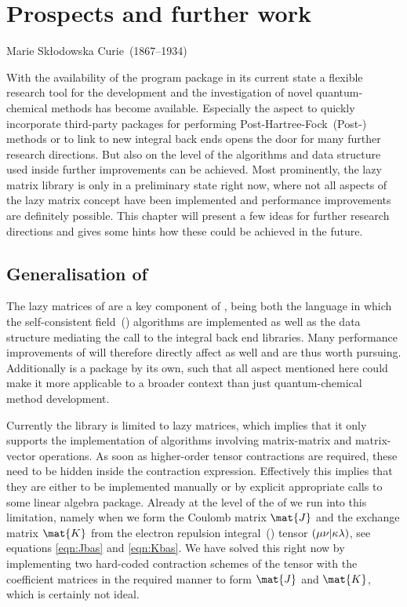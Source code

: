 \chapter{Prospects and further work}
\label{ch:Prospects}
{Marie Skłodowska Curie~(1867--1934)}

\noindent
With the availability of the \molsturm program package in its
current state a flexible research tool
for the development and the investigation of novel quantum-chemical methods
has become available.
Especially the aspect to quickly incorporate third-party packages
for performing Post-Hartree-Fock~(Post-\HF) methods
or to link to new integral back ends
opens the door for many further research directions.
But also on the level of the algorithms and data structure used
inside \molsturm further improvements can be achieved.
Most prominently, the \lazyten lazy matrix library is only
in a preliminary state right now,
where not all aspects of the lazy matrix concept have been implemented
and performance improvements are definitely possible.
This chapter will present a few ideas for further research directions
and gives some hints how these could be achieved in the future.

\section{Generalisation of \lazyten}
\label{sec:GeneraliseLazyten}
The lazy matrices of \lazyten are a key component of \molsturm,
being both the language in which the self-consistent field~(\SCF)
algorithms are implemented
as well as the data structure
mediating the call to the integral back end libraries.
Many performance improvements of \lazyten will therefore
directly affect \molsturm as well and are thus worth pursuing.
Additionally \lazyten is a package by its own,
such that all aspect mentioned here could make it more
applicable to a broader context than just
quantum-chemical method development.

Currently the \lazyten library is limited to lazy matrices,
which implies that it only supports the implementation of algorithms
involving matrix-matrix and matrix-vector operations.
As soon as higher-order tensor contractions are required,
these need to be hidden inside the contraction expression.
Effectively this implies
that they are either to be implemented manually
or by explicit appropriate calls to some linear algebra package.
Already at the level of the \SCF of \molsturm we run into this limitation,
namely when we form the Coulomb matrix $\mat{J}$
and the exchange matrix $\mat{K}$ from the electron repulsion integral~(\ERI) tensor
$\left( \mu\nu \middle| \kappa\lambda \right)$, see equations \eqref{eqn:Jbas} and \eqref{eqn:Kbas}.
We have solved this right now by implementing two
hard-coded contraction schemes of the \ERI tensor with
the coefficient matrices in the required manner to form $\mat{J}$ and $\mat{K}$,
which is certainly not ideal.


